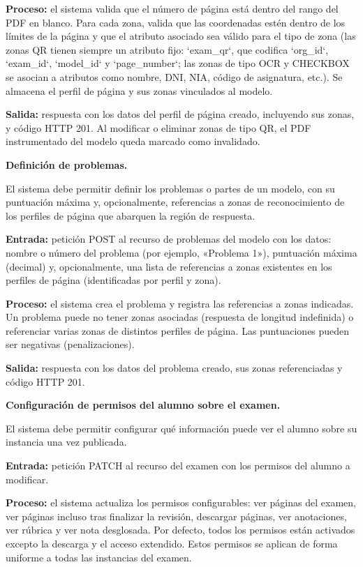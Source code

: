 \begin{functional}
\begin{functional}
    \textbf{Proceso:} el sistema valida que el número de página está dentro del rango del PDF en blanco. Para cada zona, valida que las coordenadas estén dentro de los límites de la página y que el atributo asociado sea válido para el tipo de zona (las zonas QR tienen siempre un atributo fijo: `exam\_qr`, que codifica `org\_id`, `exam\_id`, `model\_id` y `page\_number`; las zonas de tipo OCR y CHECKBOX se asocian a atributos como nombre, DNI, NIA, código de asignatura, etc.). Se almacena el perfil de página y sus zonas vinculados al modelo.

    \textbf{Salida:} respuesta con los datos del perfil de página creado, incluyendo sus zonas, y código HTTP 201. Al modificar o eliminar zonas de tipo QR, el PDF instrumentado del modelo queda marcado como invalidado.

    \item \textbf{Definición de problemas.}

    El sistema debe permitir definir los problemas o partes de un modelo, con su puntuación máxima y, opcionalmente, referencias a zonas de reconocimiento de los perfiles de página que abarquen la región de respuesta.

    \textbf{Entrada:} petición POST al recurso de problemas del modelo con los datos: nombre o número del problema (por ejemplo, «Problema 1»), puntuación máxima (decimal) y, opcionalmente, una lista de referencias a zonas existentes en los perfiles de página (identificadas por perfil y zona).

    \textbf{Proceso:} el sistema crea el problema y registra las referencias a zonas indicadas. Un problema puede no tener zonas asociadas (respuesta de longitud indefinida) o referenciar varias zonas de distintos perfiles de página. Las puntuaciones pueden ser negativas (penalizaciones).

    \textbf{Salida:} respuesta con los datos del problema creado, sus zonas referenciadas y código HTTP 201.

    \item \textbf{Configuración de permisos del alumno sobre el examen.}

    El sistema debe permitir configurar qué información puede ver el alumno sobre su instancia una vez publicada.

    \textbf{Entrada:} petición PATCH al recurso del examen con los permisos del alumno a modificar.

    \textbf{Proceso:} el sistema actualiza los permisos configurables: ver páginas del examen, ver páginas incluso tras finalizar la revisión, descargar páginas, ver anotaciones, ver rúbrica y ver nota desglosada. Por defecto, todos los permisos están activados excepto la descarga y el acceso extendido. Estos permisos se aplican de forma uniforme a todas las instancias del examen.


\end{functional}
\end{functional}
